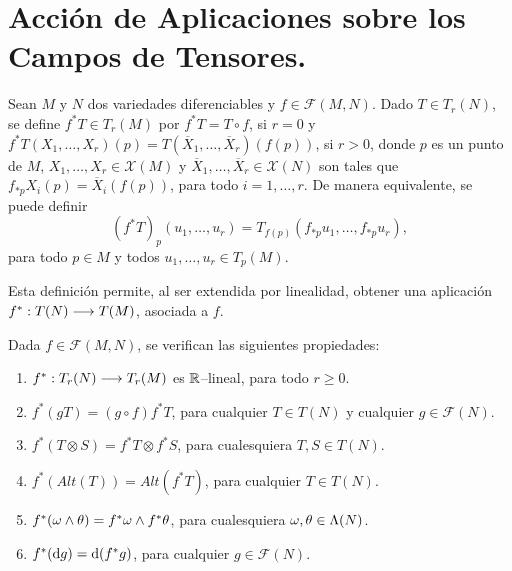 \documentclass[cursovd_portada.tex]{subfiles}
\begin{document}
\section{Acci\'{o}n de Aplicaciones sobre los Campos de Tensores.}
\begin{defi}
Sean $M$ y $N$ dos variedades diferenciables y
$f\in\mathcal{F}(M,N)$. Dado $T\in T_r(N)$, se define $f^*T\in
T_r(M)$ por $f^*T=T\circ f$, si $r=0$ y $f^*T(X_1,\dots ,X_r)(p)=
T(\overline{X}_1,\dots ,\overline{X}_r)(f(p))$, si $r>0$, donde
$p$ es un punto de $M$, $X_1,\dots ,X_r\in\mathcal{X}(M)$ y
$\overline{X}_1,\dots ,\overline{X}_r\in\mathcal{X}(N)$ son tales
que $f_{*p}X_i(p)=\overline{X}_i(f(p))$, para todo $i=1,\dots ,r$.
De manera equivalente, se puede definir
$$(f^*T)_p(u_1,\dots,u_r)=T_{f(p)}(f_{*p}u_1,\dots,f_{*p}u_r),$$
para todo $p\in M$ y todos $u_1,\dots,u_r \in T_p(M)$.
\end{defi}
Esta definici\'{o}n permite, al ser extendida por linealidad, obtener una aplicaci\'{o}n $f^*:T(N)\longrightarrow T(M)$, asociada a
$f$.
\begin{prop}
Dada $f\in\mathcal{F}(M,N)$, se verifican las siguientes
propiedades:
\begin{enumerate}
\item $f^*:T_r(N)\longrightarrow T_r(M)$ es $\mathbb{R}$--lineal, para todo $r\geq 0$.
\item $f^*(gT)=(g\circ f)f^*T$, para cualquier $T\in T(N)$ y
cualquier $g\in \mathcal{F}(N)$. \item $f^*(T\otimes
S)=f^*T\otimes f^*S$, para cualesquiera $T,S\in T(N)$. \item
$f^*(Alt(T))=Alt(f^*T)$, para cualquier $T\in T(N)$. \item
$f^*(\omega\wedge\theta)=f^*\omega\wedge f^*\theta$, para cualesquiera
$\omega,\theta\in\Lambda(N)$. \item $f^*({\rm d} g)={\rm d} (f^*g)$, para
cualquier $g\in\mathcal{F}(N)$.
\end{enumerate}
\end{prop}

\newpage
\end{document}
